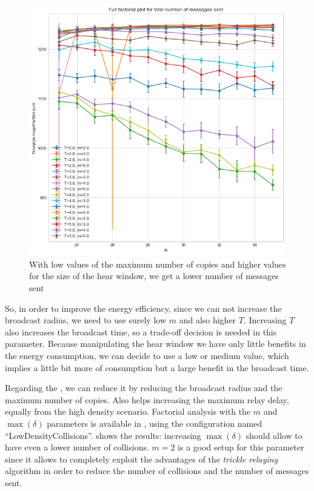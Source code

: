 \begin{figure}
	\centering
	\includegraphics[width=\textwidth]{img/ld/messages-R-ffplot.png}
	\caption{With low values of the maximum number of copies and higher
	values for the size of the hear window, we get a lower number of
	messages sent}\label{fig:rectmessagesff}
\end{figure}

So, in order to improve the energy efficiency, since we can not increase the
broadcast radius, we need to use surely low \(m\) and also higher \(T\).
Increasing \(T\) also increases the broadcast time, so a trade-off decision is
needed in this parameter. Because manipulating the hear window we have only
little benefits in the energy consumption, we can decide to use a low or medium
value, which implies a little bit more of consumption but a large benefit in the
broadcast time.

Regarding the , we can reduce it by
reducing the broadcast radius and the maximum number of copies. Also helps
increasing the maximum relay delay, equally from the high density scenario.
Factorial analysis with the \(m\) and \(\max(\delta)\) parameters is available
in , using the configuration named
``LowDensityCollisions''.  shows the results:
increasing \(\max(\delta)\) should allow to have even a lower number of
collisions. \(m\!=\!2\) is a good setup for this parameter since it allows to
completely exploit the advantages of the \emph{trickle relaying} algorithm in
order to reduce the number of collisions and the number of messages sent.

